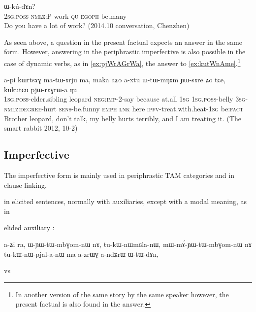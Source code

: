 \documentclass[oldfontcommands,oneside,a4paper,11pt]{article}
\newcommand{\ipa}[1]{{\phon \mbox{#1}}} %
\newcommand{\factual}[1]{\textsc{:fact}}
\begin{document}
 
 
 
 \begin{exe}
\ex \label{ex:WkudAn}
\gll \ipa{nɤ-kɤ-nɤma} 	\ipa{ɯ-kú-dɤn?}  \\
 \textsc{2sg.poss-nmlz:P}-work \textsc{qu-egoph}-be.many \\
\glt Do you have a lot of work? (2014.10 conversation, Chenzhen)
\end{exe}


 
As seen above, a question in the present factual expects an answer in the same form. However, answering in the periphrastic imperfective is also possible in the case of dynamic verbs, as in \ref{ex:pjWrAGrWa}, the answer to \ref{ex:kutWnAme}.\footnote{In another version of the same story by the same speaker however, the present factual is also found in the answer.}

 \begin{exe}
\ex \label{ex:pjWrAGrWa}
\gll
 \ipa{a-pi} 	\ipa{kɯrtsɤɣ} 	\ipa{ma-tɯ-ɤrju} 	\ipa{ma,} 	\ipa{maka} 	\ipa{aʑo} 	\ipa{a-xtu} 	\ipa{ɯ-tɯ-mŋɤm} 	\ipa{ɲɯ-sɤre} 	\ipa{ʑo} 	\ipa{tɕe,} 	\ipa{kukutɕu} 	\ipa{pjɯ-rɤɣrɯ-a} 	\ipa{ŋu} 	\\
 \textsc{1sg.poss}-elder.sibling leopard \textsc{neg:imp}-2-say because at.all \textsc{1sg} \textsc{1sg.poss}-belly \textsc{3sg-nmlz:degree}-hurt \textsc{sens}-be.funny \textsc{emph} \textsc{lnk} here \textsc{ipfv}-treat.with.heat-\textsc{1sg} be\factual{}  \\
\glt Brother leopard, don't talk, my belly hurts terribly, and I am treating it. (The smart rabbit 2012, 10-2)
 \end{exe}
 


\subsection{Imperfective} \label{sec:ipfv}
The imperfective form is mainly used in periphrastic TAM categories and in clause linking, 

in elicited sentences, normally with auxiliaries, except with a modal meaning, as in 

  elided auxiliary :
  
  \ipa{a-ʑi}  	\ipa{ra,}  	\ipa{ɯ-ɲɯ-tɯ-mbɣom-nɯ}  	\ipa{nɤ,}  	\ipa{tu-kɯ-nɯmɢla-nɯ,}  	\ipa{mɯ-mɤ́-ɲɯ-tɯ-mbɣom-nɯ}  	\ipa{nɤ}  	\ipa{tu-kɯ-nɯ-pjal-a-nɯ}  	\ipa{ma}  	\ipa{a-zrɯɣ}  	\ipa{a-ndʑrɯ}  	\ipa{ɯ-tɯ-dɤn,}  	


vs
\end{document}
